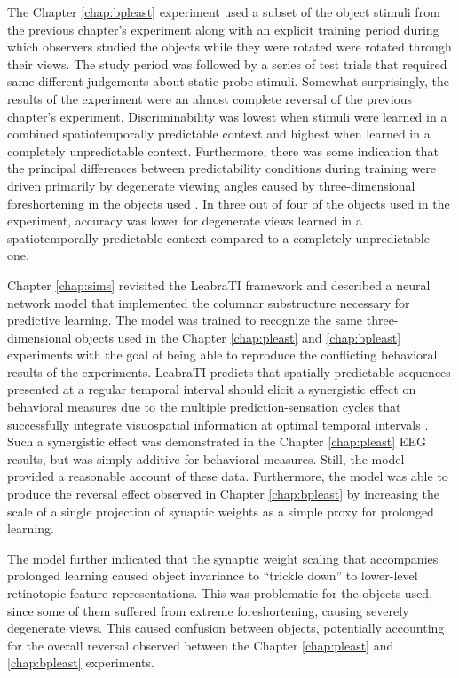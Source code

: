 \documentclass[dwyatte_dissertation.tex]{subfiles}
\begin{document}
The Chapter \ref{chap:bpleast} experiment used a subset of the object stimuli from the previous chapter's experiment along with an explicit training period during which observers studied the objects while they were rotated were rotated through their views. The study period was followed by a series of test trials that required same-different judgements about static probe stimuli. Somewhat surprisingly, the results of the experiment were an almost complete reversal of the previous chapter's experiment. Discriminability was lowest when stimuli were learned in a combined spatiotemporally predictable context and highest when learned in a completely unpredictable context. Furthermore, there was some indication that the principal differences between predictability conditions during training were driven primarily by degenerate viewing angles caused by three-dimensional foreshortening in the objects used \cite{BalasSinha09b,FarahRochlinKlen94,PizloStevenson99}. In three out of four of the objects used in the experiment, accuracy was lower for degenerate views learned in a spatiotemporally predictable context compared to a completely unpredictable one.


Chapter \ref{chap:sims} revisited the LeabraTI framework and described a neural network model that implemented the columnar substructure necessary for predictive learning. The model was trained to recognize the same three-dimensional objects used in the Chapter \ref{chap:pleast} and \ref{chap:bpleast} experiments with the goal of being able to reproduce the conflicting behavioral results of the experiments. LeabraTI predicts that spatially predictable sequences presented at a regular temporal interval should elicit a synergistic effect on behavioral measures due to the multiple prediction-sensation cycles that successfully integrate visuospatial information at optimal temporal intervals \cite[see also]{DohertyRaoMesulamEtAl05,RohenkohlGouldPessoaEtAl14}. Such a synergistic effect was demonstrated in the Chapter \ref{chap:pleast} EEG results, but was simply additive for behavioral measures. Still, the model provided a reasonable account of these data. Furthermore, the model was able to produce the reversal effect observed in Chapter \ref{chap:bpleast} by increasing the scale of a single projection of synaptic weights as a simple proxy for prolonged learning. 

The model further indicated that the synaptic weight scaling that accompanies prolonged learning caused object invariance to ``trickle down'' to lower-level retinotopic feature representations. This was problematic for the objects used, since some of them suffered from extreme foreshortening, causing severely degenerate views. This caused confusion between objects, potentially accounting for the overall reversal observed between the Chapter \ref{chap:pleast} and \ref{chap:bpleast} experiments.
\end{document}
